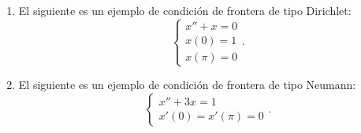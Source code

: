 \begin{eg}
\begin{enumerate}
\item El siguiente es un ejemplo de condición de frontera de tipo Dirichlet:
	\[
	\begin{cases}
	x'' + x = 0 \\
	x\left(0\right) = 1 \\
	x\left(\pi \right) = 0
	\end{cases}
	.\]
\item El siguiente es un ejemplo de condición de frontera de tipo Neumann:
	\[
	\begin{cases}
	x'' + 3x = 1 \\
	x'\left(0\right) = x'\left(\pi \right) = 0
	\end{cases}
	.\]
\end{enumerate}
\end{eg}
